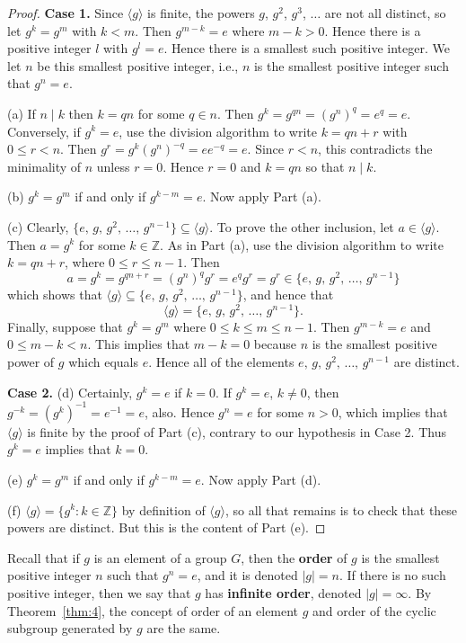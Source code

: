 \documentclass[11pt]{article}
\newcommand{\Z} {{\mathbb Z}}
\newcommand{\order}[1]{\ensuremath{|#1|}}
\newcommand{\divides}{\ensuremath{\mid}}
\newcommand{\<}{\ensuremath{\langle}}
\renewcommand{\>}{\ensuremath{\rangle}}
\newcommand{\eye}{\ensuremath{e}}
\theoremstyle{plain}
\theoremstyle{definition}
\begin{document}
\begin{proof}  {\bf Case 1.} Since $\langle g\rangle $ is finite, the powers
$g$, $g^2$, $g^3$, $\ldots$ are not all distinct, so let $g^k=g^m$
with $k<m$.  Then $g^{m-k} =\eye$ where $m-k>0$.  Hence there is a
positive integer $l$ with $g^l=\eye$.  Hence there is a smallest such
positive integer.  We let $n$ be this smallest positive integer,
i.e., $n$ is the smallest positive integer such that $g^n=\eye$.

(a)  If $n\divides k$ then $k=qn$ for some $q\in n$.  Then
$g^k=g^{qn}=(g^n)^q=\eye^q=\eye$.   Conversely, if $g^k=\eye$, use the
division algorithm to write $k=qn+r$ with $0\le r<n$.  Then
$g^r=g^k(g^n)^{-q} = \eye\eye^{-q} =\eye$.  Since $r<n$, this contradicts
the minimality of $n$ unless $r=0$.  Hence $r=0$ and $k=qn$ so
that $n\divides k$.

(b)  $g^k=g^m$ if and only if $g^{k-m} = \eye$.  Now apply Part (a).

(c)  Clearly, $\{\eye,\, g,\, g^2,\, \ldots,\, g^{n-1}\} \subseteq
\langle g\rangle$.   To prove the other inclusion, let $a\in
\langle g\rangle$.  Then $a=g^k$ for some $k\in \Z$.  As in Part
(a), use the division algorithm to write $k=qn+r$, where $0\le
r\le n-1$.  Then
$$a=g^k=g^{qn+r}=(g^n)^qg^r=\eye^qg^r=g^r\in \{\eye,\, g,\, g^2,\, \ldots,\, g^{n-1}\}$$
which shows  that $\langle g\rangle \subseteq \{\eye,\, g,\, g^2,\,
\ldots,\, g^{n-1}\}$, and hence that
$$\langle g\rangle = \{\eye,\, g,\, g^2,\, \ldots,\, g^{n-1}\}.$$
Finally, suppose that $g^k=g^m$ where $0\le k\le m\le n-1$.   Then
$g^{m-k} =\eye$ and $0\le m-k <n$.  This implies that $m-k=0$ because
$n$ is the smallest positive power of $g$ which equals $\eye$.  Hence
all of the elements $\eye,\, g,\, g^2,\, \ldots,\, g^{n-1}$ are
distinct.

{\bf Case 2.}  (d)  Certainly,  $g^k=\eye$ if $k=0$.  If $g^k=\eye$,
$k\ne 0$, then $g^{-k} = (g^k)^{-1} = \eye^{-1} = \eye$, also.  Hence
$g^n=\eye$ for some $n>0$, which implies that $\langle g\rangle$ is
finite by the proof of Part (c), contrary to our hypothesis in
Case 2.  Thus $g^k=\eye$ implies that $k=0$.

(e)  $g^k=g^m$ if and only if $g^{k-m} =\eye$.  Now apply Part (d).

(f)  $\langle g\rangle =\{g^k: k\in \Z\}$  by definition of
$\langle g\rangle$, so all that remains is to check that these
powers are distinct.  But this is the content of Part (e).
\end{proof}

Recall that if $g$ is an element of a  group $G$, then the {\bf
order} of $g$ is the smallest positive integer $n$ such that
$g^n=\eye$, and it is denoted $\order{g}=n$.  If there is no such positive
integer, then we say that $g$ has {\bf infinite order}, denoted
$\order{g}=\infty$.  By Theorem~\ref{thm:4}, the concept of order of an element
$g$ and order of the cyclic subgroup generated by $g$ are the
same.
\end{document}
